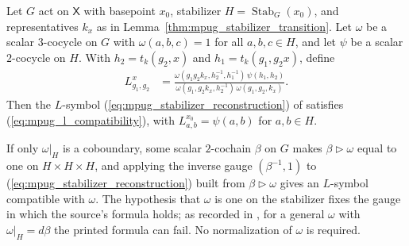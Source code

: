 \begin{lemma}
    \label{thm:mpug_stabilizer_reconstruction}
    \leanok
    Let $G$ act on $\mathsf X$ with basepoint $x_0$, stabilizer
    $H=\operatorname{Stab}_G(x_0)$, and representatives $k_x$ as in
    Lemma~\ref{thm:mpug_stabilizer_transition}. Let $\omega$ be a scalar
    $3$-cocycle on $G$ with $\omega(a,b,c)=1$ for all $a,b,c\in H$, and let
    $\psi$ be a scalar $2$-cocycle on $H$. With $h_2=t_k(g_2,x)$ and
    $h_1=t_k(g_1,g_2x)$, define
    \begin{align}
        L^x_{g_1,g_2}
         & =\frac{\omega(g_1g_2k_x,h_2^{-1},h_1^{-1})\,\psi(h_1,h_2)}
            {\omega(g_1,g_2k_x,h_2^{-1})\,\omega(g_1,g_2,k_x)}.
        \label{eq:mpug_stabilizer_reconstruction}
    \end{align}
    Then the $L$-symbol (\ref{eq:mpug_stabilizer_reconstruction}) of
    \cite[Eq.~(20)]{GarreRubio2023MPOSym} satisfies
    (\ref{eq:mpug_l_compatibility}), with
    $L^{x_0}_{a,b}=\psi(a,b)$ for $a,b\in H$.

    If only $\omega|_H$ is a coboundary, some scalar $2$-cochain $\beta$ on $G$
    makes $\beta\mathbin{\triangleright}\omega$ equal to one on
    $H\times H\times H$, and applying the inverse gauge
    $(\beta^{-1},1)$ to (\ref{eq:mpug_stabilizer_reconstruction}) built from
    $\beta\mathbin{\triangleright}\omega$ gives an $L$-symbol compatible with
    $\omega$. The hypothesis that $\omega$ is one on the stabilizer fixes the
    gauge in which the source's formula holds; as recorded in
    \cite{gap:glm23_eq20_fusion_gauge}, for a general
    $\omega$ with $\omega|_H=d\beta$ the printed formula can fail.
    No normalization of $\omega$ is required.
\end{lemma}
